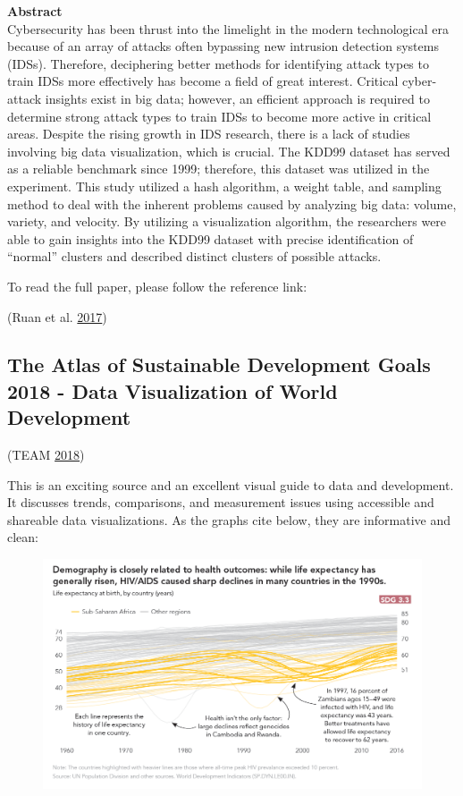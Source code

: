 \documentclass[]{book}
\begin{document}
\textbf{Abstract}\\
Cybersecurity has been thrust into the limelight in the modern
technological era because of an array of attacks often bypassing new
intrusion detection systems (IDSs). Therefore, deciphering better
methods for identifying attack types to train IDSs more effectively has
become a field of great interest. Critical cyber-attack insights exist
in big data; however, an efficient approach is required to determine
strong attack types to train IDSs to become more active in critical
areas. Despite the rising growth in IDS research, there is a lack of
studies involving big data visualization, which is crucial. The KDD99
dataset has served as a reliable benchmark since 1999; therefore, this
dataset was utilized in the experiment. This study utilized a hash
algorithm, a weight table, and sampling method to deal with the inherent
problems caused by analyzing big data: volume, variety, and velocity. By
utilizing a visualization algorithm, the researchers were able to gain
insights into the KDD99 dataset with precise identification of
``normal'' clusters and described distinct clusters of possible attacks.

To read the full paper, please follow the reference link:

(Ruan et al. \protect\hyperlink{ref-gapminder}{2017})

\subsection{The Atlas of Sustainable Development Goals 2018 - Data
Visualization of World
Development}\label{the-atlas-of-sustainable-development-goals-2018---data-visualization-of-world-development}

(TEAM \protect\hyperlink{ref-world_bank_data}{2018})

This is an exciting source and an excellent visual guide to data and
development. It discusses trends, comparisons, and measurement issues
using accessible and shareable data visualizations. As the graphs cite
below, they are informative and clean:

\begin{figure}
\centering
\includegraphics{images/case_study_1.png}
\caption{}
\end{figure}
\end{document}
